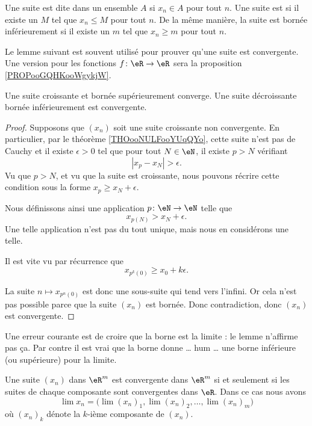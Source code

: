 Une suite est dite  dans un ensemble \( A\) si \( x_n\in A\) pour tout \( n\). Une suite est  si il existe un \( M\) tel que \( x_n\leq M\) pour tout \( n\). De la même manière, la suite est bornée inférieurement si il existe un \( m\) tel que \( x_n\geq m\) pour tout \( n\).

Le lemme suivant est souvent utilisé pour prouver qu'une suite est convergente. Une version pour les fonctions \( f\colon \eR\to \eR\) sera la proposition \ref{PROPooGQHKooWgykjW}.
\begin{lemma}       \label{LemSuiteCrBorncv}
	Une suite croissante et bornée supérieurement converge. Une suite décroissante bornée inférieurement est convergente.
\end{lemma}

\begin{proof}
	Supposons que \( (x_n)\) soit une suite croissante non convergente. En particulier, par le théorème \ref{THOooNULFooYUqQYo}, cette suite n'est pas de Cauchy et il existe \( \epsilon>0\) tel que pour tout \( N\in \eN\), il existe \( p>N\) vérifiant
	\begin{equation}
		| x_p-x_N |>\epsilon.
	\end{equation}
	Vu que \( p>N\), et vu que la suite est croissante, nous pouvons récrire cette condition sous la forme \( x_p\geq x_N+\epsilon\).

	Nous définissons ainsi une application \( p\colon \eN\to \eN\) telle que
	\begin{equation}
		x_{p(N)}>x_N+\epsilon.
	\end{equation}
	Une telle application n'est pas du tout unique, mais nous en considérons une telle.

	Il est vite vu par récurrence que
	\begin{equation}
		x_{p^k(0)}\geq x_0+k\epsilon.
	\end{equation}

	La suite \( n\mapsto x_{p^n(0)}\) est donc une sous-suite qui tend vers l'infini. Or cela n'est pas possible parce que la suite \( (x_n)\) est bornée. Donc contradiction, donc \( (x_n)\) est convergente.
\end{proof}

Une erreur courante est de croire que la borne est la limite : le lemme n'affirme pas ça. Par contre il est vrai que la borne donne \ldots{} hum \ldots{} une borne inférieure (ou supérieure) pour la limite.

\begin{proposition}     \label{PropCvRpComposante}
	Une suite \( (x_n)\) dans \( \eR^m\) est convergente dans \( \eR^m\) si et seulement si les suites de chaque composante sont convergentes dans \( \eR\). Dans ce cas nous avons
	\begin{equation}
		\lim x_n=\Big( \lim(x_n)_1,\lim (x_n)_2,\ldots,\lim (x_n)_m \Big)
	\end{equation}
	où \( (x_n)_k\) dénote la \( k\)-ième composante de \( (x_n)\).
\end{proposition}

